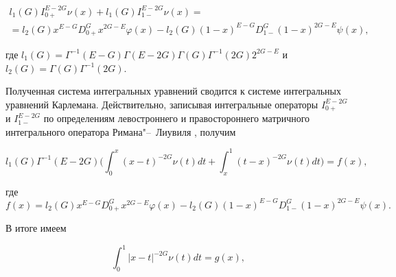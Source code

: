 




\begin{multline*}

l_1(G)I^{E-2G}_{0+}\nu(x)+l_1(G)I^{E-2G}_{1-}\nu(x)= \\ =l_2(G)x^{E-G}D^{G}_{0+}x^{2G-E}\varphi(x)

-l_2(G)(1-x)^{E-G}D^{G}_{1-}(1-x)^{2G-E}\psi(x),

\end{multline*}

где $l_1(G)=\Gamma^{-1}(E-G)\Gamma(E-2G)\Gamma(G)\Gamma^{-1}(2G)2^{2G-E}$ и $l_2(G)=\Gamma(G)\Gamma^{-1}(2G)$. 



\pagebreak



Полученная система интегральных уравнений сводится к системе интегральных уравнений Карлемана. Действительно, записывая интегральные операторы $I_{0+}^{E-2G}$ и $I_{1-}^{E-2G}$ по определениям левостроннего и правостороннего матричного интегрального оператора Римана"--~Лиувиля \cite{rayanova:bib:Andreev1990, rayanova:bib:Andreev}, получим

$$

l_1(G)\Gamma^{-1}(E-2G)\biggl(\int _{0}^{x}(x-t)^{-2G}\nu(t)dt+\int _{x}^{1}(t-x)^{-2G}\nu(t)dt\biggr)=f(x),

$$

где $$f(x)=l_2(G)x^{E-G}D^{G}_{0+}x^{2G-E}\varphi(x)-l_2(G)(1-x)^{E-G}D^{G}_{1-}(1-x)^{2G-E}\psi(x).$$

В итоге имеем

\begin{equation}

\label{isririri:3.32}

\int _{0}^{1}|x-t|^{-2G}\nu(t)dt=g(x),

\end{equation}

